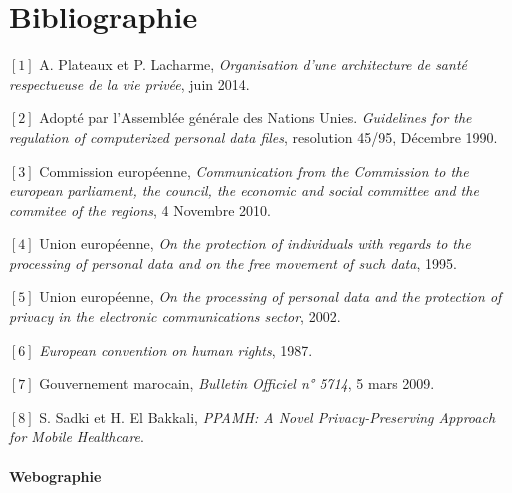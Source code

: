 
\chapter*{Bibliographie}

\footnotesize

\noindent $[1]$ \hspace{2pt} A. Plateaux et P. Lacharme, \textit{Organisation d’une architecture de santé respectueuse de la vie privée}, juin 2014.


\noindent $[2]$ \hspace{2pt} Adopté par l'Assemblée générale des Nations Unies. \textit{Guidelines for the regulation of computerized personal data files}, resolution 45/95, Décembre 1990.

\noindent $[3]$ \hspace{2pt} Commission européenne, \textit{Communication from the Commission to the european parliament, the council, the economic and social committee and the commitee of the regions}, 4 Novembre 2010.

\noindent $[4]$ \hspace{2pt} Union européenne, \textit{On the protection of individuals with regards to the processing of personal data and on the free movement of such data}, 1995.

\noindent $[5]$ \hspace{2pt} Union européenne, \textit{On the processing of personal data and the protection of privacy in the electronic communications sector}, 2002.

\noindent $[6]$ \hspace{2pt} \textit{European convention on human rights}, 1987.

\noindent $[7]$ \hspace{2pt} Gouvernement marocain, \textit{Bulletin Officiel n° 5714}, 5 mars 2009.

\noindent $[8]$ \hspace{2pt} S. Sadki et H. El Bakkali, \textit{PPAMH: A Novel Privacy-Preserving Approach for Mobile Healthcare}.


\subsubsection*{Webographie}

